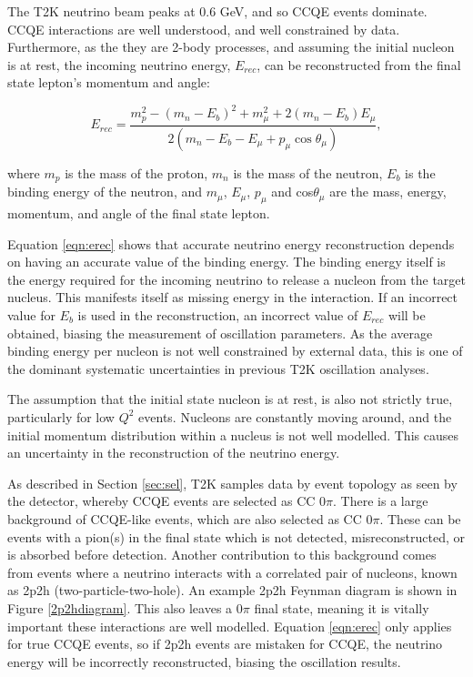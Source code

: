 The T2K neutrino beam peaks at 0.6 GeV, and so CCQE events dominate. CCQE interactions are well understood, and well constrained by data. Furthermore, as the they are 2-body processes, and assuming the initial nucleon is at rest, the incoming neutrino energy, $E_{rec}$, can be reconstructed from the final state lepton's momentum and angle:

\begin{equation}
E_{rec} = \frac{m_p^2 - (m_n - E_b)^2 + m_\mu^2 + 2(m_n - E_b)E_\mu}{2(m_n - E_b - E_\mu + p_\mu \cos \theta_\mu)},
\label{eqn:erec}
\end{equation}

where $m_p$ is the mass of the proton, $m_n$ is the mass of the neutron, $E_b$ is the binding energy of the neutron, and $m_\mu$, $E_\mu$, $p_\mu$ and cos$\theta_\mu$ are the mass, energy, momentum, and angle of the final state lepton.

Equation \ref{eqn:erec} shows that accurate neutrino energy reconstruction depends on having an accurate value of the binding energy. The binding energy itself is the energy required for the incoming neutrino to release a nucleon from the target nucleus. This manifests itself as missing energy in the interaction. If an incorrect value for $E_b$ is used in the reconstruction, an incorrect value of $E_{rec}$ will be obtained, biasing the measurement of oscillation parameters. As the average binding energy per nucleon is not well constrained by external data, this is one of the dominant systematic uncertainties in previous T2K oscillation analyses.

The assumption that the initial state nucleon is at rest, is also not strictly true, particularly for low $Q^2$ events. Nucleons are constantly moving around, and the initial momentum distribution within a nucleus is not well modelled. This causes an uncertainty in the reconstruction of the neutrino energy.

As described in Section \ref{sec:sel}, T2K samples data by event topology as seen by the detector, whereby CCQE events are selected as CC 0$\pi$. There is a large background of CCQE-like events, which are also selected as CC 0$\pi$. These can be events with a pion(s) in the final state which is not detected, misreconstructed, or is absorbed before detection. Another contribution to this background comes from events where a neutrino interacts with a correlated pair of nucleons, known as 2p2h (two-particle-two-hole). An example 2p2h Feynman diagram is shown in Figure \ref{2p2hdiagram}. This also leaves a 0$\pi$ final state, meaning it is vitally important these interactions are well modelled. Equation \ref{eqn:erec} only applies for true CCQE events, so if 2p2h events are mistaken for CCQE, the neutrino energy will be incorrectly reconstructed, biasing the oscillation results.

